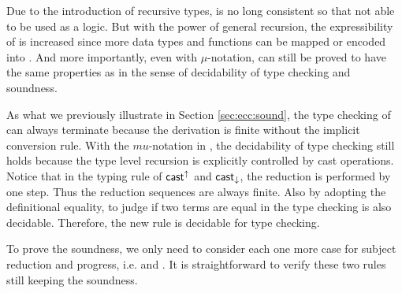 Due to the introduction of recursive types, \name is no long consistent so that not able to be used as a logic. But with the power of general recursion, the expressibility of \name is increased since more data types and functions can be mapped or encoded into \name. And more importantly, even with $\mu$-notation, \name can still be proved to have the same properties as \name in the sense of decidability of type checking and soundness.

As what we previously illustrate in Section \ref{sec:ecc:sound}, the type checking of \expcc can always terminate because the derivation is finite without the implicit conversion rule. With the $mu$-notation in \name, the decidability of type checking still holds because the type level recursion is explicitly controlled by cast operations. Notice that in the typing rule of $ \mathsf{cast}^{\uparrow} $ and $ \mathsf{cast}_{\downarrow} $, the reduction is performed by one step. Thus the reduction sequences are always finite. Also by adopting the definitional equality, to judge if two terms are equal in the type checking is also decidable. Therefore, the new  rule is decidable for type checking.

To prove the soundness, we only need to consider each one more case for subject reduction and progress, i.e.  and . It is straightforward to verify these two rules still keeping the soundness.
